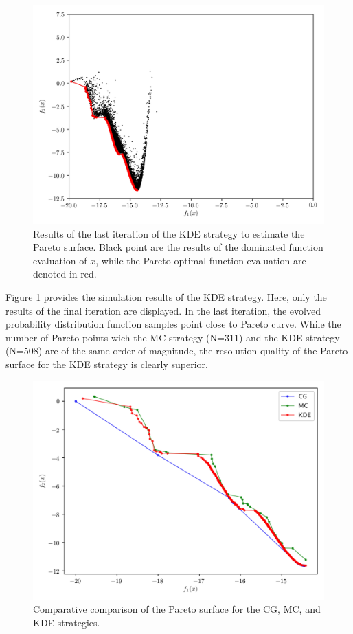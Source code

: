 \begin{figure}[htbp]
	\centering
  \includegraphics{chapter3/kurasawe_kde}
  \caption{Results of the last iteration of the KDE strategy to estimate the Pareto surface.  Black point are the results of the dominated function evaluation of $x$, while the Pareto optimal function evaluation are denoted in red.}
  \label{fig:kurawawe_kde}
\end{figure}

Figure \ref{fig:kurawawe_kde} provides the simulation results of the KDE strategy.  Here, only the results of the final iteration are displayed.  In the last iteration, the evolved probability distribution function samples point close to Pareto curve.  While the number of Pareto points wich the MC strategy (N=311) and the KDE strategy (N=508) are of the same order of magnitude, the resolution quality of the Pareto surface for the KDE strategy is clearly superior.

\begin{figure}[htbp]
	\centering
  \includegraphics{chapter3/kurasawe_comparison}
  \caption{Comparative comparison of the Pareto surface for the CG, MC, and KDE strategies.}
  \label{fig:kurasawe_comparison}
\end{figure}

